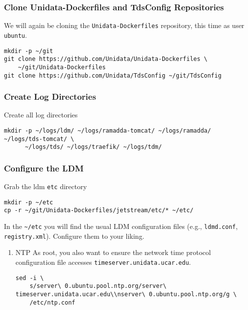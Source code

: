 \documentclass[onecolumn,9pt]{article}
\begin{document}
\subsubsection{Clone Unidata-Dockerfiles and TdsConfig Repositories}
\label{sec:orgheadline19}

We will again be cloning the \texttt{Unidata-Dockerfiles} repository, this time as user \texttt{ubuntu}.

\begin{verbatim}
mkdir -p ~/git
git clone https://github.com/Unidata/Unidata-Dockerfiles \
    ~/git/Unidata-Dockerfiles
git clone https://github.com/Unidata/TdsConfig ~/git/TdsConfig
\end{verbatim}

\subsubsection{Create Log Directories}
\label{sec:orgheadline20}

Create all log directories

\begin{verbatim}
mkdir -p ~/logs/ldm/ ~/logs/ramadda-tomcat/ ~/logs/ramadda/ ~/logs/tds-tomcat/ \
      ~/logs/tds/ ~/logs/traefik/ ~/logs/tdm/
\end{verbatim}

\subsubsection{Configure the LDM}
\label{sec:orgheadline22}

Grab the ldm \texttt{etc} directory

\begin{verbatim}
mkdir -p ~/etc
cp -r ~/git/Unidata-Dockerfiles/jetstream/etc/* ~/etc/
\end{verbatim}

In the \texttt{\textasciitilde{}/etc} you will find the usual LDM configuration files (e.g., \texttt{ldmd.conf}, \texttt{registry.xml}). Configure them to your liking.

\begin{enumerate}
\item NTP
\label{sec:orgheadline21}
As root, you also want to ensure the network time protocol configuration file accesses \texttt{timeserver.unidata.ucar.edu}.

\begin{verbatim}
sed -i \
    s/server\ 0.ubuntu.pool.ntp.org/server\ timeserver.unidata.ucar.edu\\nserver\ 0.ubuntu.pool.ntp.org/g \
    /etc/ntp.conf
\end{verbatim}
\end{enumerate}
\end{document}

